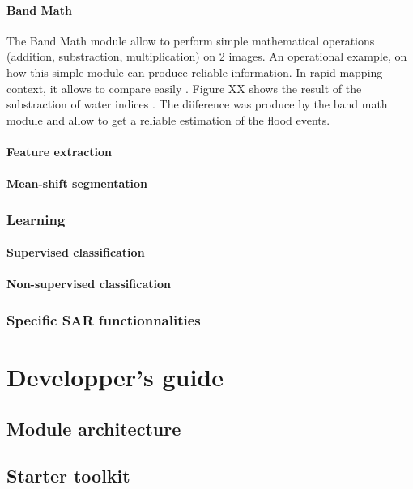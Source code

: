 \documentclass{InsightSoftwareGuide}
\begin{document}
\subsection{Band Math}
The Band Math module allow to perform simple mathematical operations (addition, substraction, multiplication) on 2 images. 
An operational example, on how this simple module can produce reliable information.
In rapid mapping context, it allows to compare easily . Figure XX shows the result of the substraction of water indices . The diiference was produce by the band math module
and allow to get a reliable estimation of the flood events.
\subsection{Feature extraction}
\subsection{Mean-shift segmentation}
\section{Learning}
\subsection{Supervised classification}
\subsection{Non-supervised classification}
\section{Specific SAR functionnalities}



\part{Developper's guide}\label{part:developperguide}
\chapter{Module architecture}
\chapter{Starter toolkit}

% 
% 
\end{document}
